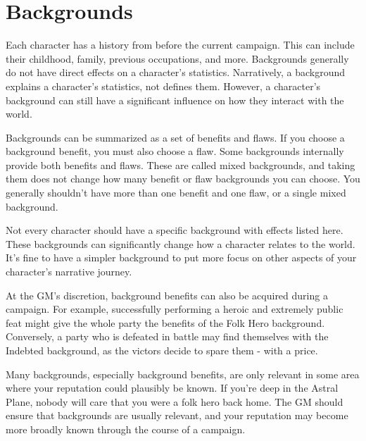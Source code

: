 \section{Backgrounds}\label{Backgrounds}
  Each character has a history from before the current campaign.
  This can include their childhood, family, previous occupations, and more.
  Backgrounds generally do not have direct effects on a character's statistics.
  Narratively, a background explains a character's statistics, not defines them.
  However, a character's background can still have a significant influence on how they interact with the world.

  Backgrounds can be summarized as a set of benefits and flaws.
  If you choose a background benefit, you must also choose a flaw.
  Some backgrounds internally provide both benefits and flaws.
  These are called mixed backgrounds, and taking them does not change how many benefit or flaw backgrounds you can choose.
  You generally shouldn't have more than one benefit and one flaw, or a single mixed background.

  Not every character should have a specific background with effects listed here.
  These backgrounds can significantly change how a character relates to the world.
  It's fine to have a simpler background to put more focus on other aspects of your character's narrative journey.

  At the GM's discretion, background benefits can also be acquired during a campaign.
  For example, successfully performing a heroic and extremely public feat might give the whole party the benefits of the Folk Hero background.
  Conversely, a party who is defeated in battle may find themselves with the Indebted background, as the victors decide to spare them - with a price.

  Many backgrounds, especially background benefits, are only relevant in some area where your reputation could plausibly be known.
  If you're deep in the Astral Plane, nobody will care that you were a folk hero back home.
  The GM should ensure that backgrounds are usually relevant, and your reputation may become more broadly known through the course of a campaign.

